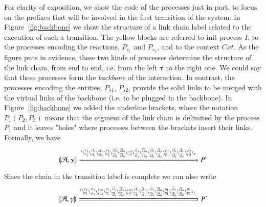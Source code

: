 \begin{example}
For clarity of exposition, we show the code of the processes just in part, to focus on the prefixes that will be involved in the first transition of the system. In Figure~\ref{fig:backbone} we show the  structure of a link chain label related to the execution of such a transition. The yellow blocks are referred to init process $I$, to the processes encoding the reactions, $P_{r_1}$ and $P_{r_2}$, and to the context $\mathit{Cxt}$. As the figure puts in evidence, these two kinds of processes determine the structure of the link chain, from end to end, i.e. from the left $\tau$ to the right one. We could say that these processes form the \emph{backbone} of the interaction.
   In contrast, the processes encoding the entities, $P_{s1}$,  $\overline{P}_{s2}$, provide the
    solid links to be merged with the virtual links of the backbone (i.e. to be plugged in the backbone).
{\color{red}  In Figure~\ref{fig:backbone} we added the underline brackets, where the notation $P_1(P_2,P_3)$ means that the segment of the link chain is delimited by the process $P_1$ and it leaves "holes" where processes between the brackets insert their links.}
 Formally, we have
 $$
 \llparenthesis{\cal A},\gamma\rrparenthesis \xrightarrow{
 {}^{\tau}
 \backslash_{r_1}^{r_1}
 \backslash_{s1_i}^{s1_i}
 \backslash_{s1_o}^{s1_o}
 \backslash_{r_2}^{r_2}
 \backslash_{\overline{s2}_i}^{\overline{s2}_i}
 \backslash_{\overline{s2}_o}^{\overline{s2}_o}
 \backslash_{\mathit{cxt}}^{\mathit{cxt}}
 \backslash_{\widehat{s1}_i}^{\widehat{s1}_i}
 \backslash_{\widehat{s1}_o}^{\widehat{s1}_o}
  \backslash_{\widehat{s2}_i}^{\widehat{s2}_i}
  \backslash_{\widehat{s2}_o}^{\widehat{s2}_o}
  \backslash_{p_1}^{p_1}
  \backslash_{\widetilde{s2}_i}^{\widetilde{s2}_i}
  \backslash_{\widetilde{s2}_o}^{\widetilde{s2}_o}
  \backslash_{p_2}^{p_2}
  \backslash_{\tau}
 }
 P'
 $$
 
 Since the chain in the transition label is complete we can also write
  $$
 \llparenthesis{\cal A},\gamma\rrparenthesis \xRightarrow{
 \ensuremath{{}^{\tau}}
 \ensuremath{\backslash_{r_1}^{r_1}}
 \ensuremath{\backslash_{s1_i}^{s1_i}}
 \ensuremath{\backslash_{s1_o}^{s1_o}}
 \ensuremath{\backslash_{r_2}^{r_2}}
 \ensuremath{\backslash_{\overline{s2}_i}^{\overline{s2}_i}}
 \ensuremath{\backslash_{\overline{s2}_o}^{\overline{s2}_o}}
 \ensuremath{\backslash_{\mathit{cxt}}^{\mathit{cxt}}}
 \ensuremath{\backslash_{\widehat{s1}_i}^{\widehat{s1}_i}}
 \ensuremath{\backslash_{\widehat{s1}_o}^{\widehat{s1}_o}}
  \ensuremath{\backslash_{\widehat{s2}_i}^{\widehat{s2}_i}}
  \ensuremath{\backslash_{\widehat{s2}_o}^{\widehat{s2}_o}}
  \ensuremath{\backslash_{p_1}^{p_1}}
  \ensuremath{\backslash_{\widetilde{s2}_i}^{\widetilde{s2}_i}}
  \ensuremath{\backslash_{\widetilde{s2}_o}^{\widetilde{s2}_o}}
  \ensuremath{\backslash_{p_2}^{p_2}}
  \ensuremath{\backslash_{\tau}}
 }
 P'
 $$


\end{example}
